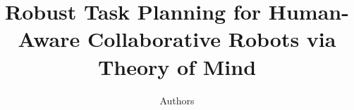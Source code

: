 \documentclass[letterpaper]{article} %
\title
{
Robust Task Planning for Human-Aware Collaborative Robots via Theory of Mind
}
\author{
    Authors
}
\begin{document}


\maketitle

\begin{abstract}


\end{abstract}
\end{document}
